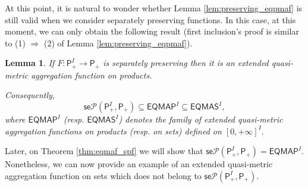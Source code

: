 \documentclass[11pt,a4paper]{amsart}
\newtheorem{lemma}[theorem]{Lemma}
\theoremstyle{definition}
\begin{document}
	At this point, it is natural to wonder whether  Lemma \ref{lem:preserving_eqpmaf} is still valid when we consider separately preserving functions. In this case, at this moment, we can only obtain the following result (first inclusion's proof is similar to (1) $\Rightarrow$ (2) of Lemma \ref{lem:preserving_eqpmaf}).
	
	
	\begin{lemma}\label{lem:preserving_eqmaf}
		If $F:\mathsf{P}_+^I\to \mathsf{P}_+$ is separately preserving then it is an extended quasi-metric aggregation function on products.
		
		
		Consequently,
		$$\mathsf{se}\mathscr{P}(\mathsf{P}_+^I,\mathsf{P}_+)\subseteq\mathsf{EQMAP}^I\subseteq\mathsf{EQMAS}^I,$$
		where $\mathsf{EQMAP}^I$ {\rm(}resp. $\mathsf{EQMAS}^I${\rm)} denotes the family of extended quasi-metric aggregation functions on products {\rm(}resp. on sets{\rm)} defined on $[0,+\infty]^I.$
	\end{lemma}
	
	
	Later, on Theorem \ref{thm:eqmaf_spf} we will show that $\mathsf{se}\mathscr{P}(\mathsf{P}_+^I,\mathsf{P}_+)=\mathsf{EQMAP}^I.$ Nonetheless, we can now provide an example of an extended quasi-metric aggregation function on sets which does not belong to $\mathsf{se}\mathscr{P}(\mathsf{P}_+^I,\mathsf{P}_+)$.
	
\end{document}
